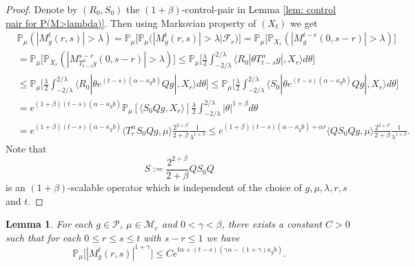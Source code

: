 \documentclass[12pt,oneside,english]{amsart}
\theoremstyle{plain}
\newtheorem{lem}[thm]{Lemma}
\theoremstyle{definition}
\numberwithin{equation}{section}
\newcommand{\added}[1]{{\color{blue}#1}}\newcommand{\deleted}[1]{{\color{red}#1}}
\begin{document}
\added{
\begin{proof}
    Denote by $(R_0,S_0)$ the $(1+\beta)$-control-pair in Lemma \ref{lem: control pair for P(M>lambda)}. 
    Then using Markovian property of $(X_t)$ we get
\begin{align}
    &\mathbb P_{\mu}(|M^t_g(r,s)|>\lambda) 
    = \mathbb P_\mu \big[\mathbb P_\mu\big(|M_g^t(r,s)|> \lambda\big| \mathscr F_r\big)\big]
    = \mathbb P_\mu \big[\mathbb P_{X_r}(|M^{t-r}_g(0,s-r)|> \lambda)\big] 
    \\&= \mathbb P_\mu \big[\mathbb P_{X_r}(|M^{s-r}_{T^\alpha_{t-s}g}(0,s-r)|> \lambda)\big]
    \leq \mathbb P_\mu \Big[ \frac{\lambda}{2}\int_{-2/\lambda}^{2/\lambda}\langle R_0|\theta T^\alpha_{t-s}g|,X_r\rangle d\theta \Big]
    \\&\leq \mathbb P_\mu \Big[ \frac{\lambda}{2}\int_{-2/\lambda}^{2/\lambda}\langle R_0|\theta e^{(t-s)(\alpha- \kappa_gb)}Qg|,X_r\rangle d\theta \Big] 
    \leq \mathbb P_\mu \Big[ \frac{\lambda}{2}\int_{-2/\lambda}^{2/\lambda}\langle S_0|\theta e^{(t-s)(\alpha- \kappa_gb)}Qg|,X_r\rangle d\theta \Big] 
    \\& = e^{(1+\beta)(t-s)(\alpha- \kappa_gb)} \mathbb P_\mu [ \langle S_0Qg,X_r\rangle ] \frac{\lambda}{2}\int_{-2/\lambda}^{2/\lambda}|\theta|^{1+\beta}d\theta
    \\& = e^{(1+\beta)(t-s)(\alpha- \kappa_gb)} \langle T_r^\alpha S_0Qg,\mu\rangle  \frac{2^{2+\beta}}{2+\beta}\frac{1}{\lambda^{1+\beta}}
    \leq e^{(1+\beta)(t-s)(\alpha- \kappa_gb)+ \alpha r} \langle QS_0Qg,\mu\rangle  \frac{2^{2+\beta}}{2+\beta}\frac{1}{\lambda^{1+\beta}}.
\end{align}
    Note that
\[
    S := \frac{2^{2+\beta}}{2+\beta}QS_0Q 
\]
    is an $(1+\beta)$-scalable operator which is independent of the choice of $g,\mu, \lambda, r, s$ and $t$.
\end{proof}
}
\added{
\begin{lem}
    For each $g\in \mathcal P$, $\mu \in \mathcal M_c$ and $0<\gamma < \beta$, there exists a constant $C>0$ such that for each $0\leq r\leq s\leq t$ with $s-r \leq 1$ we have
\[
    \mathbb P_\mu\big[|M^t_g(r,s)|^{1+\gamma}\big] 
    \leq C e^{t\alpha+(t-s) (\gamma\alpha- (1+\gamma)\kappa_gb)}.
\]
\end{lem}
}
\end{document}
